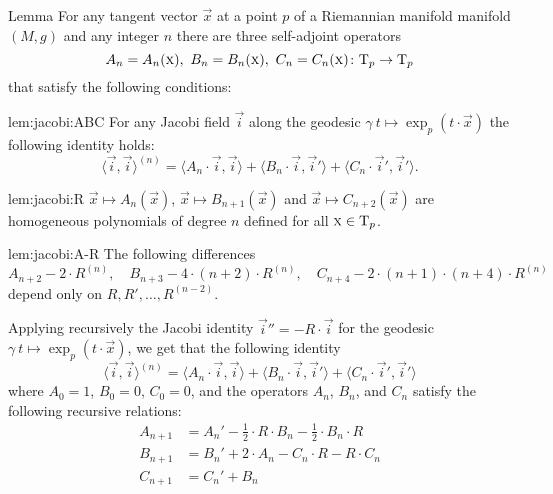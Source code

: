 \documentclass[a4paper,10pt]{article}
\begin{document}
\begin{thm}{Lemma}\label{lem:jacobi}
For any tangent vector $\vec{x}$ at a point $p$ of a Riemannian manifold manifold $(M,g)$ and any integer $n$ there are three self-adjoint operators 
\[A_n=A_n(\vec{x}),\ B_n=B_n(\vec{x}),\ C_n=C_n(\vec{x})\:\T_p\to \T_p\]
that satisfy the following conditions:

\begin{subthm}{lem:jacobi:ABC}
For any Jacobi field $\vec{i}$ along the geodesic $\gamma\:t\mapsto \exp_p(t\cdot \vec{x})$ the following identity holds:
\[\langle \vec{i},\vec{i}\rangle^{(n)}
=
\langle A_n\cdot  \vec{i},\vec{i}\rangle+ \langle B_n\cdot \vec{i}, \vec{i}'\rangle+\langle C_n\cdot \vec{i}', \vec{i}'\rangle.\]
\end{subthm}

\begin{subthm}{lem:jacobi:R}
 $\vec{x}\mapsto A_{n}(\vec{x})$, $\vec{x}\mapsto B_{n+1}(\vec{x})$ and $\vec{x}\mapsto C_{n+2}(\vec{x})$ are homogeneous polynomials of degree $n$ defined for all $\text{\sc{x}}\in \mathrm{T}_p$.
\end{subthm}

\begin{subthm}{lem:jacobi:A-R}
The following differences  
\[A_{n+2}-2\cdot R^{(n)},
\quad 
B_{n+3}-4\cdot(n+2)\cdot R^{(n)},
\quad
C_{n+4}-2\cdot(n+1)\cdot(n+4)\cdot R^{(n)}\]
depend only on $R,R',\dots, R^{(n-2)}$.
\end{subthm}


\end{thm}

Applying recursively the Jacobi identity $\vec{i}''=-R\cdot \vec{i}$ for the geodesic $\gamma\:t\mapsto\exp_p(t\cdot \vec{x})$, we get that the following identity 
\[\langle \vec{i},\vec{i}\rangle^{(n)}
=
\langle A_n\cdot  \vec{i},\vec{i}\rangle+ \langle B_n\cdot \vec{i},\vec{i}'\rangle+\langle C_n\cdot \vec{i}',\vec{i}'\rangle\]
where $A_0=1$, $B_0=0$, $C_0=0$, and the operators $A_n$, $B_n$, and $C_n$ satisfy the following recursive relations:
\begin{align*}
A_{n+1}&=A_n'-\tfrac12\cdot R\cdot B_n-\tfrac12\cdot B_n\cdot R
\\
B_{n+1}&=B_n'+ 2\cdot A_n-C_n\cdot R-R\cdot C_n
\\
C_{n+1}&=C_n'+ B_n
\end{align*}
\end{document}
